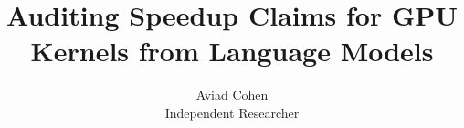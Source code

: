 \documentclass{article}
\title{Auditing Speedup Claims for GPU Kernels from Language Models}
\author{Aviad Cohen\\Independent Researcher}
\begin{document}
\maketitle

\begin{abstract}

\end{abstract}






\label{mainmatterend}
\clearpage



\clearpage
\appendix
\small

\end{document}
